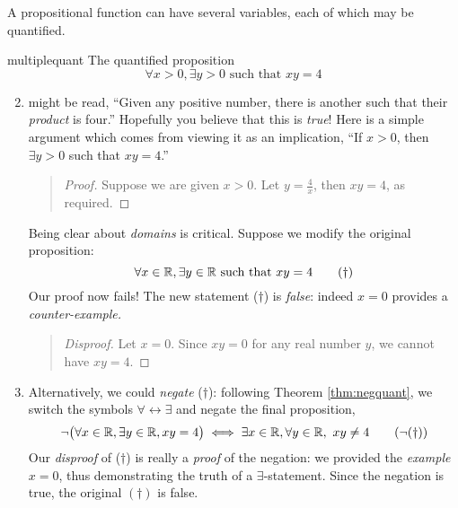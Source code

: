 A propositional function can have several variables, each of which may be quantified.

\begin{examples}{}{multiplequant}
	\exstart The quantified proposition
	\[
		\forall x>0,\exists y>0\text{ such that }xy=4
	\]
	\begin{enumerate}\setcounter{enumi}{1}
	  \item[]might be read, ``Given any positive number, there is another such that their \emph{product} is four.''	Hopefully you believe that this is \emph{true}! Here is a simple argument which comes from viewing it as an implication, ``If $x>0$, then $\exists y>0$ such that $xy=4$.''
	\begin{quote}
		\begin{proof}
			Suppose we are given $x>0$. Let $y=\frac 4x$, then $xy=4$, as required.
		\end{proof}
	\end{quote}Being clear about \emph{domains} is critical. Suppose we modify the original proposition:
		\[
			\forall x\in\mathbb{R},\exists y\in\mathbb{R}\text{ such that }xy=4 \tag{$\dag$}
		\]
		Our proof now fails! The new statement ($\dag$) is \emph{false}: indeed $x=0$ provides a \emph{counter-example.}
	\begin{quote}
		\begin{proof}[Disproof]
			Let $x=0$. Since $xy=0$ for any real number $y$, we cannot have $xy=4$.
		\end{proof}
	\end{quote}
	  \item[] Alternatively, we could \emph{negate} ($\dag$): following Theorem \ref{thm:negquant}, we switch the symbols $\forall\leftrightarrow\exists$ and negate the final proposition,\footnotemark{}
		\[
			\neg\bigl(\forall x\in\mathbb{R},\exists y\in\mathbb{R}, xy=4\bigr) \iff \exists x\in\mathbb{R}, \forall y\in\mathbb{R},\ xy\neq 4 \tag{$\neg (\dag)$}
		\]
		Our \emph{disproof} of ($\dag$) is really a \emph{proof} of the negation: we provided the \emph{example} $x=0$, thus demonstrating the truth of a $\exists$-statement. Since the negation is true, the original $(\dag)$ is false.
		

\end{enumerate}
\end{examples}
